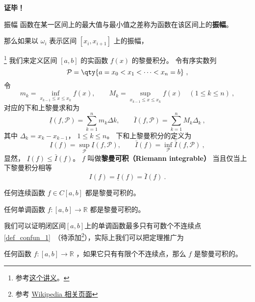\textbf{证毕！}

\begin{definition}{振幅}
函数在某一区间上的最大值与最小值之差称为函数在该区间上的\textbf{振幅}。
\end{definition}
那么如果以 $\omega_i$ 表示区间 $[x_i,x_{i+1}]$ 上的振幅，

\footnote{参考\href{https://math.berkeley.edu/~arveson/Dvi/105/note1.pdf}{这个讲义}。}
我们来定义区间 $[a, b]$ 的实函数 $f(x)$ 的黎曼积分。 令有序实数列
\begin{equation}
\mathcal P = \qty{a = x_0 < x_1 < \dots < x_n = b}~,
\end{equation}
令
\begin{equation}
m_k = \inf_{x_{k-1} \le x \le x_k} f(x), \qquad M_k = \sup_{x_{k-1} \le x \le x_k} f(x) \quad (1 \le k \le n)~,
\end{equation}
对应的下和上黎曼求和为
\begin{equation}
\underline I(f, \mathcal P) = \sum_{k = 1}^n m_k\Delta k, \qquad \bar I(f, \mathcal P) = \sum_{k = 1}^n M_k \Delta_k~,
\end{equation}
其中 $\Delta_k = x_k - x_{k-1}$， $1\le k\le n$。 下和上黎曼积分的定义为
\begin{equation}
\underline I(f) = \sup_{\mathcal P} \underline I(f, \mathcal P), \qquad \bar I(f) = \inf_{\mathcal P} \bar I(f, \mathcal P)~,
\end{equation}
显然， $\underline I(f) \le \bar I(f)$。 $f$ 叫做\textbf{黎曼可积（Riemann integrable）} 当且仅当上下黎曼积分相等
\begin{equation}
I(f) = \underline I(f) = \bar I(f)~.
\end{equation}

\begin{theorem}{}
任何连续函数 $f \in C[a, b]$ 都是黎曼可积的。
\end{theorem}

\begin{theorem}{}
任何单调函数 $f: [a, b] \to \mathbb{R}$ 都是黎曼可积的。
\end{theorem}

我们可以证明闭区间$[a, b]$上的单调函数最多只有可数个不连续点\autoref{def_confun_1}~（待添加\footnote{参考 \href{https://en.wikipedia.org/wiki/Discontinuities_of_monotone_functions}{Wikipedia 相关页面}}），实际上我们可以把定理推广为

\begin{theorem}{}
任何函数 $f: [a, b] \to \mathbb{R}$ ，如果它只有有限个不连续点，那么 $f$ 是黎曼可积的。
\end{theorem}

